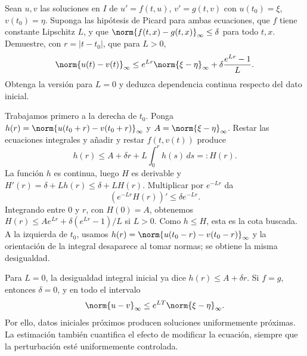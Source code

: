 \begin{ejercicio}\label{ej:ampl-picard-3}
Sean $u,v$ las soluciones en $I$ de $u'=f(t,u)$, $v'=g(t,v)$ con $u(t_0)=\xi$, $v(t_0)=\eta$. Suponga las hipótesis de Picard para ambas ecuaciones, que $f$ tiene constante Lipschitz $L$, y que $\norm{f(t,x)-g(t,x)}_\infty\le\delta$ para todo $t,x$. Demuestre, con $r=|t-t_0|$, que para $L>0$,
\[
 \norm{u(t)-v(t)}_\infty
 \le e^{Lr}\norm{\xi-\eta}_\infty
       +\delta\frac{e^{Lr}-1}{L}.
\]
Obtenga la versión para $L=0$ y deduzca dependencia continua respecto del dato inicial.
\end{ejercicio}
\begin{solucion}
Trabajamos primero a la derecha de $t_0$. Ponga $h(r)=\norm{u(t_0+r)-v(t_0+r)}_\infty$ y $A=\norm{\xi-\eta}_\infty$. Restar las ecuaciones integrales y añadir y restar $f(t,v(t))$ produce
\[
 h(r)\le A+\delta r+L\int_0^r h(s)\,ds=:H(r).
\]
La función $h$ es continua, luego $H$ es derivable y
$H'(r)=\delta+Lh(r)\le\delta+LH(r)$. Multiplicar por $e^{-Lr}$ da
\[
 (e^{-Lr}H(r))'\le\delta e^{-Lr}.
\]
Integrando entre $0$ y $r$, con $H(0)=A$, obtenemos
$H(r)\le Ae^{Lr}+\delta(e^{Lr}-1)/L$ si $L>0$. Como $h\le H$, esta es la cota buscada. A la izquierda de $t_0$, usamos $h(r)=\norm{u(t_0-r)-v(t_0-r)}_\infty$ y la orientación de la integral desaparece al tomar normas; se obtiene la misma desigualdad.

Para $L=0$, la desigualdad integral inicial ya dice $h(r)\le A+\delta r$. Si $f=g$, entonces $\delta=0$, y en todo el intervalo
\[
 \norm{u-v}_\infty\le e^{LT}\norm{\xi-\eta}_\infty.
\]
Por ello, datos iniciales próximos producen soluciones uniformemente próximas. La estimación también cuantifica el efecto de modificar la ecuación, siempre que la perturbación esté uniformemente controlada.
\end{solucion}

